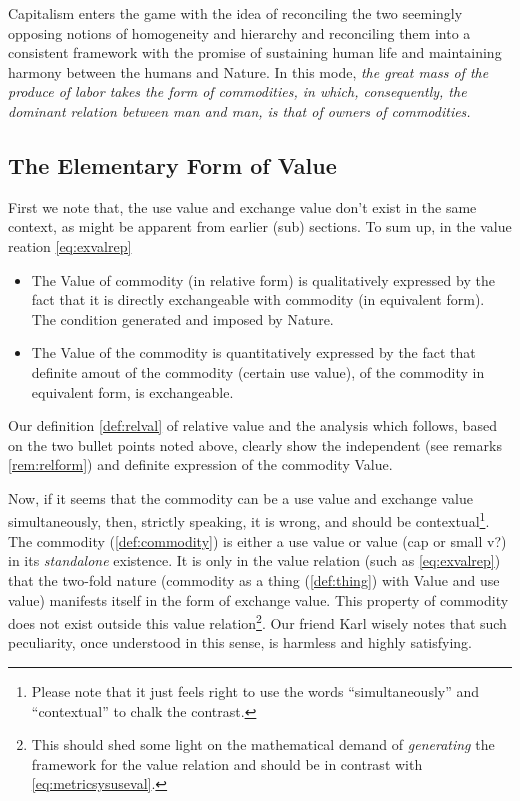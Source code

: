 \documentclass[12pt]{extarticle}
\theoremstyle{definition}
\begin{document}
Capitalism enters the game with the idea of reconciling the two seemingly opposing notions of homogeneity and hierarchy and reconciling them into a consistent framework with the promise of sustaining human life and maintaining harmony between the humans and Nature.  In this mode, \emph{the great mass of the produce of labor takes the form of commodities, in which, consequently, the dominant relation between man and man, is that of owners of commodities.}

\subsection{The Elementary Form of Value}
\label{sec:elemformval}
First we note that, the use value and exchange value don't exist in the same context, as might be apparent from earlier (sub) sections.  To sum up, in the value reation \ref{eq:exvalrep} 
\begin{itemize}
\item The Value of commodity (in relative form) is qualitatively expressed by the fact that it is directly exchangeable with commodity (in equivalent form).  The condition generated and imposed by Nature.
  \item The Value of the commodity is quantitatively expressed by the fact that definite amout of the commodity (certain use value), of the commodity in equivalent form, is exchangeable.
  \end{itemize}

  Our definition \ref{def:relval} of relative value and the analysis which follows, based on the two bullet points noted above, clearly show the independent (see remarks \ref{rem:relform}) and definite expression of the commodity Value.

  Now, if it seems that the commodity can be a use value and exchange value simultaneously, then, strictly speaking, it is wrong, and should be contextual\footnote{Please note that it just feels right to use the words ``simultaneously'' and ``contextual'' to chalk the contrast.}.  The commodity (\ref{def:commodity}) is either a use value or value (cap or small v?) in its \emph{standalone} existence.  It is only in the value relation (such as \ref{eq:exvalrep}) that the two-fold nature (commodity as a thing (\ref{def:thing}) with Value and use value)  manifests itself in the form of exchange value.  This property of commodity does not exist outside this value relation\footnote{This should shed some light on the mathematical demand of \emph{generating} the framework for the value relation and should be in contrast with \ref{eq:metricsysuseval}.}.  Our friend Karl wisely notes that such peculiarity, once understood in this sense, is harmless and highly satisfying.
\end{document}
